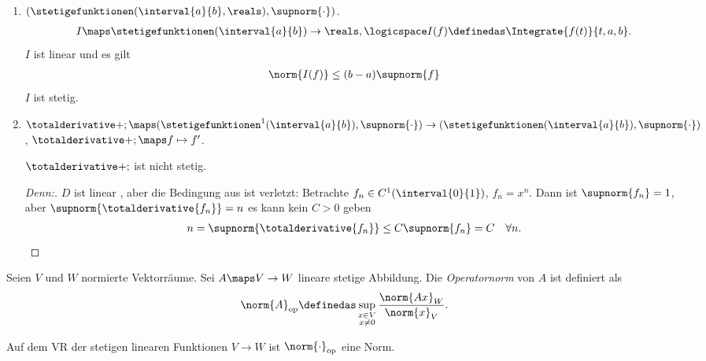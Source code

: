 \begin{beispiele*}
    \begin{enumerate}
        \item \( (\stetigefunktionen(\interval{a}{b},\reals),\supnorm{\cdot}) \).
        \begin{align*}
            I\maps \stetigefunktionen(\interval{a}{b})\to \reals,\logicspace I(f)\definedas \Integrate{f(t)}{t,a,b}.
        \end{align*}
        \( I \) ist linear und es gilt
        \begin{align*}
            \norm{I(f)}\leq (b-a)\supnorm{f}
        \end{align*}
        \timplies \( I \) ist stetig.
        \item \( \totalderivative+;\maps (\stetigefunktionen^1(\interval{a}{b}),\supnorm{\cdot})\to (\stetigefunktionen(\interval{a}{b}),\supnorm{\cdot}) \), \( \totalderivative+;\maps f\mapsto f' \).
        \begin{behauptung*}
            \( \totalderivative+; \) ist nicht stetig.
        \end{behauptung*}
        \begin{proof}[Denn:]
            \( D \) ist linear \checkmark, aber die Bedingung aus  ist verletzt: Betrachte \( f_n\in C^1(\interval{0}{1}) \), \( f_n=x^n    \).
            Dann ist \( \supnorm{f_n}=1 \), aber \( \supnorm{\totalderivative{f_n}}=n \) \timplies es kann kein \( C>0 \) geben \sd
            \begin{align*}
                n=\supnorm{\totalderivative{f_n}}\leq C\supnorm{f_n}=C\quad \forall n.
            \end{align*}
        \end{proof}
    \end{enumerate}
\end{beispiele*}
\begin{definition*}
    Seien \( V \) und \( W \) normierte Vektorräume.
    Sei \( A\maps V\to W \) lineare stetige Abbildung.
    Die \emph{Operatornorm} von \( A \) ist definiert als
    \begin{align*}
        \norm{A}_{\text{op}}\definedas \sup_{\substack{x\in V\\ x\neq 0}}\frac{\norm{Ax}_{W}}{\norm{x}_{V}}.
    \end{align*}
\end{definition*}
    Auf dem VR der stetigen linearen Funktionen \( V\to W \) ist \( \norm{\cdot}_{\text{op}} \) eine Norm.
